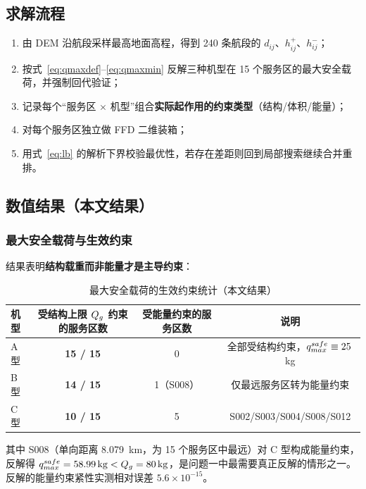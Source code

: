 \subsection{求解流程}

\begin{enumerate}[label=\textbf{步骤 \arabic*}]
	\item 由 DEM 沿航段采样最高地面高程，得到 240 条航段的 $d_{ij}$、$h_{ij}^{+}$、$h_{ij}^{-}$；
	\item 按式~\eqref{eq:qmaxdef}--\eqref{eq:qmaxmin} 反解三种机型在 15 个服务区的最大安全载荷，并强制回代验证；
	\item 记录每个“服务区 $\times$ 机型”组合\textbf{实际起作用的约束类型}（结构/体积/能量）；
	\item 对每个服务区独立做 FFD 二维装箱；
	\item 用式~\eqref{eq:lb} 的解析下界校验最优性，若存在差距则回到局部搜索继续合并重排。
\end{enumerate}

\subsection{数值结果（本文结果）}

\subsubsection{最大安全载荷与生效约束}

结果表明\textbf{结构载重而非能量才是主导约束}：

\begin{table}[htbp]
	\caption{最大安全载荷的生效约束统计（本文结果）}
	\label{tab:q1bound}
	\centering
	\begin{tabular}{lccc}
		\toprule
		机型 & 受结构上限 $Q_{g}$ 约束的服务区数 & 受能量约束的服务区数 & 说明 \\
		\midrule
		A 型 & \textbf{15 / 15} & 0 & 全部受结构约束，$q_{max}^{safe}\equiv 25$\,kg \\
		B 型 & \textbf{14 / 15} & 1（S008） & 仅最远服务区转为能量约束 \\
		C 型 & \textbf{10 / 15} & 5 & S002/S003/S004/S008/S012 \\
		\bottomrule
	\end{tabular}
\end{table}

其中 S008（单向距离 \SI{8.079}{km}，为 15 个服务区中最远）对 C 型构成能量约束，反解得 $q_{max}^{safe}=\SI{58.99}{kg}<Q_{g}=\SI{80}{kg}$，是问题一中最需要真正反解的情形之一。反解的能量约束紧性实测相对误差 $5.6\times10^{-15}$。

